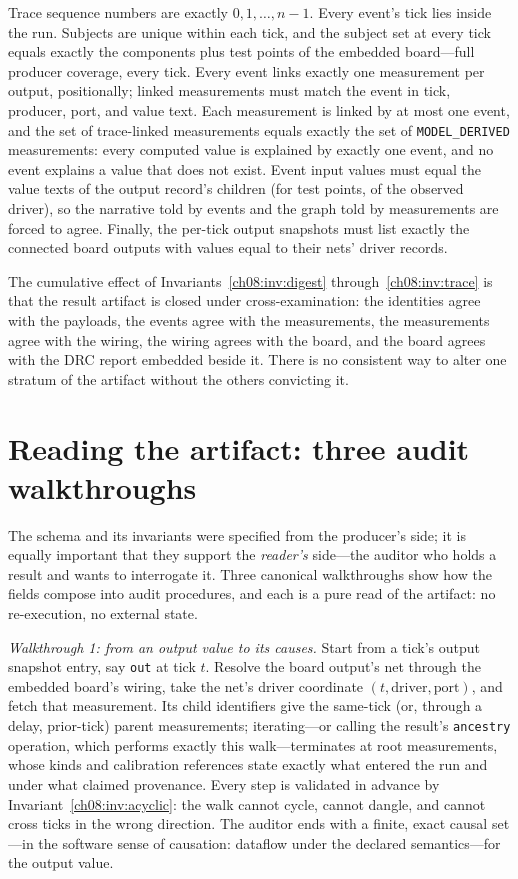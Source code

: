 \begin{invariant}\label{ch08:inv:trace}
Trace sequence numbers are exactly $0, 1, \ldots, n-1$. Every event's tick lies inside the run. Subjects are unique within each tick, and the subject set at every tick equals exactly the components plus test points of the embedded board---full producer coverage, every tick. Every event links exactly one measurement per output, positionally; linked measurements must match the event in tick, producer, port, and value text. Each measurement is linked by at most one event, and the set of trace-linked measurements equals exactly the set of \texttt{MODEL\_DERIVED} measurements: every computed value is explained by exactly one event, and no event explains a value that does not exist. Event input values must equal the value texts of the output record's children (for test points, of the observed driver), so the narrative told by events and the graph told by measurements are forced to agree. Finally, the per-tick output snapshots must list exactly the connected board outputs with values equal to their nets' driver records.
\end{invariant}

The cumulative effect of Invariants~\ref{ch08:inv:digest} through~\ref{ch08:inv:trace} is that the result artifact is closed under cross-examination: the identities agree with the payloads, the events agree with the measurements, the measurements agree with the wiring, the wiring agrees with the board, and the board agrees with the DRC report embedded beside it. There is no consistent way to alter one stratum of the artifact without the others convicting it.

\section{Reading the artifact: three audit walkthroughs}\label{ch08:sec:audit}

The schema and its invariants were specified from the producer's side; it is equally important that they support the \emph{reader's} side---the auditor who holds a result and wants to interrogate it. Three canonical walkthroughs show how the fields compose into audit procedures, and each is a pure read of the artifact: no re-execution, no external state.

\emph{Walkthrough 1: from an output value to its causes.} Start from a tick's output snapshot entry, say \texttt{out} at tick $t$. Resolve the board output's net through the embedded board's wiring, take the net's driver coordinate $(t, \text{driver}, \text{port})$, and fetch that measurement. Its child identifiers give the same-tick (or, through a delay, prior-tick) parent measurements; iterating---or calling the result's \texttt{ancestry} operation, which performs exactly this walk---terminates at root measurements, whose kinds and calibration references state exactly what entered the run and under what claimed provenance. Every step is validated in advance by Invariant~\ref{ch08:inv:acyclic}: the walk cannot cycle, cannot dangle, and cannot cross ticks in the wrong direction. The auditor ends with a finite, exact causal set---in the software sense of causation: dataflow under the declared semantics---for the output value.

